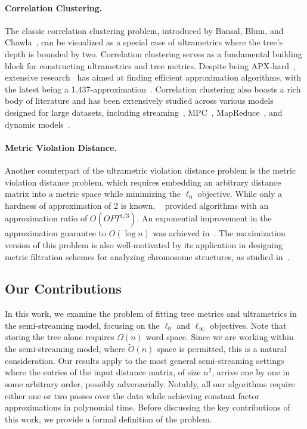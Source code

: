 \documentclass{article}
\begin{document}
\paragraph{Correlation Clustering.} The classic correlation clustering problem, introduced by Bansal, Blum, and Chawla~\cite{DBLP:conf/focs/BansalBC02}, can be visualized as a special case of ultrametrics where the tree's depth is bounded by two. Correlation clustering serves as a fundamental building block for constructing ultrametrics and tree metrics. Despite being APX-hard~\cite{apxCorrClust}, extensive research~\cite{DBLP:conf/focs/BansalBC02, apxCorrClust, ChawlaMSY15, Cohen-AddadLN22,Cohen-AddadL0N23} has aimed at finding efficient approximation algorithms, with the latest being a 1.437-approximation~\cite{DBLP:conf/stoc/CaoCL0NV24}. Correlation clustering also boasts a rich body of literature and has been extensively studied across various models designed for large datasets, including streaming~\cite{ahn2021correlation, Assadi022, BehnezhadCMT22,Cohen-AddadLN22}, MPC~\cite{cohen2021correlation}, MapReduce~\cite{ChierichettiDK14}, and dynamic models~\cite{BehnezhadDHSS19,abs-2404-06797,abs-2402-15668}.

\paragraph{Metric Violation Distance.} Another counterpart of the ultrametric violation distance problem is the metric violation distance problem, which requires embedding an arbitrary distance matrix into a metric space while minimizing the $\ell_0$ objective. While only a hardness of approximation of 2 is known, ~\cite{GilbertJ17, FanRB18,GilbertGRRW20} provided algorithms with an approximation ratio of $O(OPT^{1/3})$.
An exponential improvement in the approximation guarantee to \(O(\log n)\) was achieved in~\cite{cohen2022fitting}. The maximization version of this problem is also well-motivated by its application in designing metric filtration schemes for analyzing chromosome structures, as studied in~\cite{chromosomeCorrClust}.

\subsection{Our Contributions}

In this work, we examine the problem of fitting tree metrics and ultrametrics in the semi-streaming model, focusing on the \(\ell_0\) and \(\ell_\infty\) objectives. 
Note that storing the tree alone requires \(\Omega(n)\) word space. Since we are working within the semi-streaming model, where \(\tilde{O}(n)\) space is permitted, this is a natural consideration.
Our results apply to the most general semi-streaming settings where the entries of the input distance matrix, of size \(n^2\), arrive one by one in some arbitrary order, possibly adversarially.  Notably, all our algorithms require either one or two passes over the data while achieving constant factor approximations in polynomial time. Before discussing the key contributions of this work, we provide a formal definition of the problem.
\end{document}
